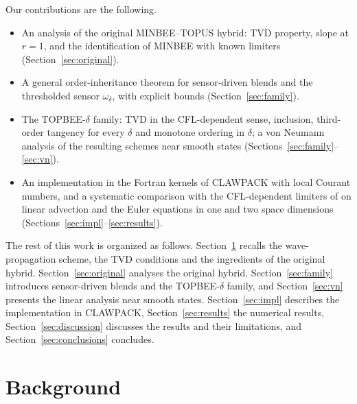 \documentclass[11pt]{article}
\newcommand{\scheme}{TOPBEE-$\delta$}
\theoremstyle{plain}
\theoremstyle{definition}
\begin{document}
Our contributions are the following.
\begin{itemize}
\item An analysis of the original MINBEE--TOPUS hybrid: TVD property, slope at $r=1$, and the identification of MINBEE with known limiters (Section~\ref{sec:original}).
\item A general order-inheritance theorem for sensor-driven blends and the thresholded sensor $\omega_\delta$, with explicit bounds (Section~\ref{sec:family}).
\item The \scheme{} family: TVD in the CFL-dependent sense, inclusion, third-order tangency for every $\delta$ and monotone ordering in $\delta$; a von Neumann analysis of the resulting schemes near smooth states (Sections~\ref{sec:family}--\ref{sec:vn}).
\item An implementation in the Fortran kernels of CLAWPACK with local Courant numbers, and a systematic comparison with the CFL-dependent limiters of \cite{Kemm2011} on linear advection and the Euler equations in one and two space dimensions (Sections~\ref{sec:impl}--\ref{sec:results}).
\end{itemize}

The rest of this work is organized as follows. Section~\ref{sec:background} recalls the wave-propagation scheme, the TVD conditions and the
ingredients of the original hybrid. Section~\ref{sec:original} analyses the original hybrid. Section~\ref{sec:family} introduces
sensor-driven blends and the \scheme{} family, and Section~\ref{sec:vn} presents the linear analysis near smooth states.
Section~\ref{sec:impl} describes the implementation in CLAWPACK, Section~\ref{sec:results} the numerical results,
Section~\ref{sec:discussion} discusses the results and their limitations, and Section~\ref{sec:conclusions} concludes.

\section{Background}\label{sec:background}
\end{document}
